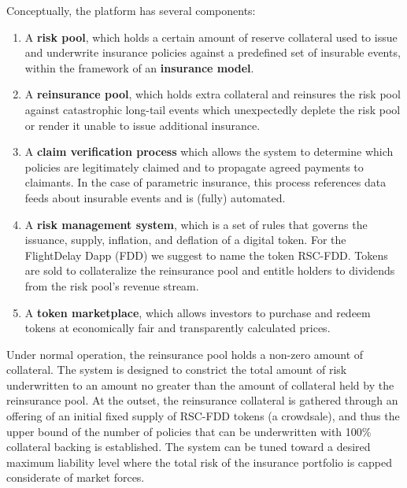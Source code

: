 \documentclass[12pt]{article}
\begin{document}
Conceptually, the platform has several components: 

\begin{enumerate}
    
    \item A \textbf{risk pool}, which holds a certain amount of reserve collateral used to issue and underwrite insurance policies against a predefined set of insurable events, within the framework of an \textbf{insurance model}. 

    \item A \textbf{reinsurance pool}, which holds extra collateral and reinsures the risk pool against catastrophic long-tail events which unexpectedly deplete the risk pool or render it unable to issue additional insurance.

    \item A \textbf{claim verification process} which allows the system to determine which policies are legitimately claimed and to propagate agreed payments to claimants. In the case of parametric insurance, this process references data feeds about insurable events and is (fully) automated.
    
    \item A \textbf{risk management system}, which is a set of rules that governs the issuance, supply, inflation, and deflation of a digital token. For the FlightDelay Dapp (FDD) we suggest to name the token RSC-FDD. Tokens are sold to collateralize the reinsurance pool and entitle holders to dividends from the risk pool's revenue stream.

    \item A \textbf{token marketplace}, which allows investors to purchase and redeem tokens at economically fair and transparently calculated prices.

\end{enumerate}

Under normal operation, the reinsurance pool holds a non-zero amount of collateral. The system is designed to constrict the total amount of risk underwritten to an amount no greater than the amount of collateral held by the reinsurance pool. At the outset, the reinsurance collateral is gathered through an offering of an initial fixed supply of RSC-FDD tokens (a crowdsale), and thus the upper bound of the number of policies that can be underwritten with 100\% collateral backing is established. The system can be tuned toward a desired maximum liability level where the total risk of the insurance portfolio is capped considerate of market forces.
\end{document}
